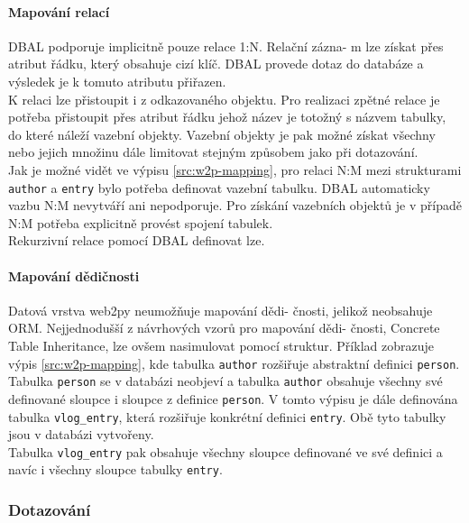 \documentclass[ing,male,java,dept456]{diploma}						%
\begin{document}
\paragraph{Mapování relací}

DBAL podporuje implicitně pouze relace 1:N. Relační zázna- m lze získat přes atribut řádku, který obsahuje cizí klíč. DBAL provede dotaz do databáze a výsledek je k tomuto atributu přiřazen. \\
K relaci lze přistoupit i z odkazovaného objektu. Pro realizaci zpětné relace je potřeba přistoupit přes atribut řádku jehož název je totožný s názvem tabulky, do které náleží vazební objekty. Vazební objekty je pak možné získat všechny nebo jejich množinu dále limitovat stejným způsobem jako při dotazování. \\
Jak je možné vidět ve výpisu \ref{src:w2p-mapping}, pro relaci N:M mezi strukturami \lstinline[style=inlinepython]|author| a \lstinline[style=inlinepython]|entry| bylo potřeba definovat vazební tabulku. DBAL automaticky vazbu N:M nevytváří ani nepodporuje. Pro získání vazebních objektů je v případě N:M potřeba explicitně provést spojení tabulek. \\
Rekurzivní relace pomocí DBAL definovat lze. \\

\paragraph{Mapování dědičnosti}
Datová vrstva web2py neumožňuje mapování dědi- čnosti, jelikož neobsahuje ORM. Nejjednodušší z návrhových vzorů pro mapování dědi- čnosti, Concrete Table Inheritance, lze ovšem nasimulovat pomocí struktur. Příklad zobrazuje výpis \ref{src:w2p-mapping}, kde tabulka \lstinline[style=inlinepython]|author| rozšiřuje abstraktní definici \lstinline[style=inlinepython]|person|. Tabulka \lstinline[style=inlinepython]|person| se v databázi neobjeví a tabulka \lstinline[style=inlinepython]|author| obsahuje všechny své definované sloupce i sloupce z definice \lstinline[style=inlinepython]|person|. V tomto výpisu je dále definována tabulka \lstinline[style=inlinepython]|vlog_entry|, která rozšiřuje konkrétní definici \lstinline[style=inlinepython]|entry|. Obě tyto tabulky jsou v databázi vytvořeny. \\
Tabulka \lstinline[style=inlinepython]|vlog_entry| pak obsahuje všechny sloupce definované ve své definici a navíc i všechny sloupce tabulky \lstinline[style=inlinepython]|entry|.

\subsubsection{Dotazování}
\end{document}
